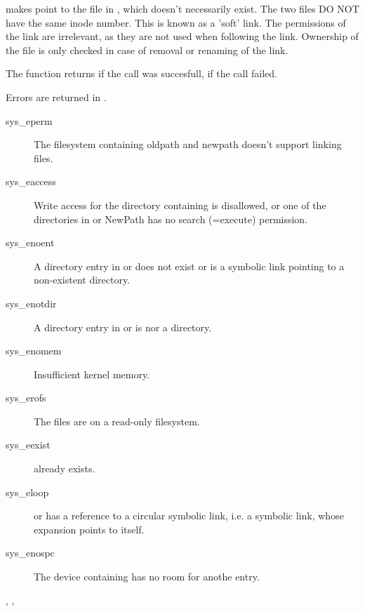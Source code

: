 { makes  point to the file in , which doesn't
necessarily exist. The two files DO NOT have the same inode number.
This is known as a 'soft' link.
The permissions of the link are irrelevant, as they are not used when
following the link. Ownership of the file is only checked in case of removal
or renaming of the link.

The function returns  if the call was succesfull,  if the call
failed.
}
{ Errors are returned in .
\begin{description}
\item[sys\_eperm] The filesystem containing oldpath and newpath doesn't
support linking files.
\item[sys\_eaccess] Write access for the directory containing 
is disallowed, or one of the directories in  or {NewPath} has no
search (=execute) permission.
\item[sys\_enoent] A directory entry in  or  does
not exist or is a symbolic link pointing to a non-existent directory.
\item[sys\_enotdir] A directory entry in  or  is
nor a directory.
\item[sys\_enomem] Insufficient kernel memory.
\item[sys\_erofs] The files are on a read-only filesystem.
\item[sys\_eexist]  already exists.
\item[sys\_eloop]  or  has a reference to a circular
symbolic link, i.e. a symbolic link, whose expansion points to itself.
\item[sys\_enospc] The device containing  has no room for anothe
entry.
\end{description}
}
{, ,  }



